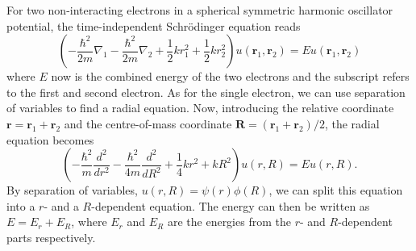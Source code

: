\documentclass{emulateapj}
\begin{document}
        For two non-interacting electrons in a spherical symmetric harmonic oscillator potential, the time-independent Schr\"odinger equation reads
        \begin{equation*}
            \left(-\dfrac{\hbar^2}{2m}\nabla_{1} - \dfrac{\hbar^2}{2m}\nabla_{2} + \dfrac{1}{2} k r_1^2 + \dfrac{1}{2} k r_2^2\right) u(\bm{r}_{1}, \bm{r}_{2}) = E u(\bm{r}_{1}, \bm{r}_{2})
        \end{equation*}
        where \(E\) now is the combined energy of the two electrons and the subscript refers to the first and second electron. As for the single electron, we can use separation of variables to find a radial equation. Now, introducing the relative coordinate \(\bm{r} = \bm{r}_{1} + \bm{r}_{2}\) and the centre-of-mass coordinate \(\bm{R} = (\bm{r}_{1} + \bm{r}_{2})/2\), the radial equation becomes
        \begin{equation*}
            \left( - \dfrac{\hbar^2}{m}\dfrac{d^2}{dr^2} - \dfrac{\hbar^2}{4m}\dfrac{d^2}{dR^2} + \dfrac{1}{4} k r^2 + k R^2 \right) u(r, R) = E u(r, R).
        \end{equation*}
        By separation of variables, \(u(r, R) = \psi(r) \phi(R)\), we can split this equation into a \(r\)- and a \(R\)-dependent equation. The energy can then be written as \(E = E_r + E_R\), where \(E_{r}\) and \(E_{R}\) are the energies from the \(r\)- and \(R\)-dependent parts respectively. 
        
\end{document}
